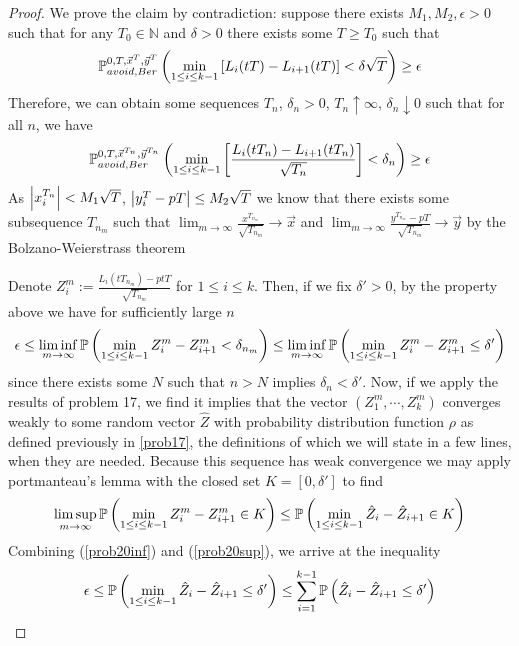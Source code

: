 \begin{proof}
	We prove the claim by contradiction:
	suppose there exists $M_1,M_2,\epsilon>0$ such that for any $T_0\in \mathbb{N}$ and $\delta>0$ there exists some $T\geq T_0$ such that \[
	\pr^{0,T,\vec x^T,\vec y^T}_{avoid, Ber}\left(\min_{1\leq i\leq k-1}\left[L_i(tT)-L_{i+1}(tT)\right]<\delta\sqrt{T}\right)\geq \epsilon
	\]
	Therefore, we can obtain some sequences $T_n$, $\delta_n>0$, $T_n\uparrow \infty$, $\delta_n\downarrow 0$ such that for all $n$, we have  
	\[
	\pr^{0,T,\vec x^{T_n},\vec y^{T_n}}_{avoid, Ber}\left(\min_{1\leq i\leq k-1}\left[\frac{L_i(tT_n)-L_{i+1}(tT_n)}{\sqrt{T_n}}\right]<\delta_n\right)\geq \epsilon
	\]
	As $\abs*{x_i^{T_n}}<M_1\sqrt{T}$, $\abs*{y_i^T-pT}\leq M_2\sqrt{T}$ we know that there exists some subsequence $T_{n_m}$ such that $\lim_{m\to\infty} \frac{x^{T_{n_m}}}{\sqrt{T_{n_m}}}\to \vec x$ 
	and 
	$\lim_{m\to\infty}\frac{y^{T_{n_m}}-pT}{\sqrt{T_{n_m}}}\to \vec y$ 
	by the Bolzano-Weierstrass theorem
	
	Denote $Z_i^m:=\frac{L_i(tT_{n_m})-ptT}{\sqrt{T_{n_m}}}$ for $1\leq i \leq k$. Then, if we fix $\delta'>0$, by the property above we have for sufficiently large $n$
	\begin{equation}\label{prob20inf}
	\epsilon\leq \liminf_{m\to\infty}\pr\left(\min_{1\leq i\leq k-1}Z_i^m-Z_{i+1}^m<\delta_{n_m}\right)\leq \liminf_{m\to\infty}\pr\left(\min_{1\leq i\leq k-1}Z_i^m-Z_{i+1}^m\leq\delta'\right)
	\end{equation}
	since there exists some $N$ such that $n>N$ implies $\delta_n<\delta'$.
	Now, if we apply the results of problem 17, we find it implies that the vector $(Z_1^m,\cdots, Z_k^m)$ converges weakly to some random vector $\hat Z$ with probability distribution function $\rho$ as defined previously in \ref{prob17}, the definitions of which we will state in a few lines, when  they are needed.
	Because this sequence has weak convergence we may apply portmanteau's lemma with the closed set $K=[0,\delta']$ to find 
	\begin{equation}\label{prob20sup}
	\limsup_{m\to\infty }\pr\left(\min_{1\leq i\leq k-1}Z_i^m-Z_{i+1}^m\in K\right)\leq \pr\left(\min_{1\leq i\leq k-1}\hat Z_i-\hat Z_{i+1}\in K\right)
	\end{equation}
	Combining (\ref{prob20inf}) and (\ref{prob20sup}), we arrive at the inequality
	\begin{equation}\label{eq:ineq}
	\epsilon\leq \pr\left(\min_{1\leq i\leq k-1} \hat Z_i-\hat Z_{i+1}\leq\delta'\right)\leq \sum_{i=1}^{k-1}\pr\left(\hat Z_i-\hat Z_{i+1}\leq \delta'\right)
	\end{equation}
	

\end{proof}
